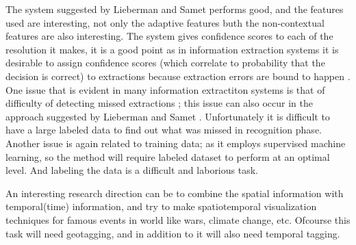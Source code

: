 \documentclass[
     11pt,         %
     a4paper,      %
     oneside,
     ]{article}
\begin{document}
The system suggested by Lieberman and Samet performs good, and the features used are interesting, not only the adaptive features buth the non-contextual features are also interesting. The system gives confidence scores to each of the resolution it makes, it is a good point as in information extraction systems it is desirable to assign confidence scores (which correlate to probability that the decision is correct) to extractions because extraction errors are bound to happen \cite{Sarawagi:2008:IE:1498844.1498845}. One issue that is evident in many information extractiton systems is that of difficulty of detecting missed extractions \cite{Sarawagi:2008:IE:1498844.1498845}; this issue can also occur in the approach suggested by Lieberman and Samet \cite{Lieberman12adaptivecontext}. Unfortunately it is difficult to have a large labeled data to find out what was missed in recognition phase. Another issue is again related to training data; as it employs supervised machine learning, so the method will require labeled dataset to perform at an  optimal level. And labeling the data is a difficult and laborious task.

An interesting research direction can be to combine the spatial information with temporal(time) information, and try to make spatiotemporal visualization techniques for famous events in world like wars, climate change, etc. Ofcourse this task will need geotagging, and in addition to it will also need temporal tagging.


\newpage
{}


\end{document}
